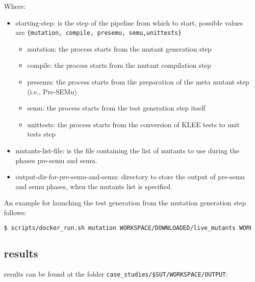Where:
\begin{itemize}
	\item starting-step: is the step of the pipeline from which to start, possible values are \texttt{\{mutation, compile, presemu, semu,unittests\}}
	\begin{itemize}
		\item mutation: the process starts from the mutant generation step
		\item compile: the process starts from the mutant compilation step
		\item presemu: the process starts from the preparation of the meta mutant step (i.e., Pre-SEMu)
		\item semu: the process starts from the test generation step itself
		\item unittests: the process starts from the conversion of KLEE tests to unit tests step
	\end{itemize}
	\item mutants-list-file: is the file containing the list of mutants to use during the phases pre-semu and semu.
	\item output-dir-for-pre-semu-and-semu: directory to store the output of pre-semu and semu phases, when the mutants list is specified.
\end{itemize}

An example for launching the test generation from the mutation generation step follows:

\begin{lstlisting}[language=bash]
 $ scripts/docker_run.sh mutation WORKSPACE/DOWNLOADED/live_mutants WORKSPACE/OUTPUT/live_mutants_output
\end{lstlisting}

\subsection{\SEMUS results}

\SEMUS results can be found at the folder \texttt{case\_studies/\$SUT/WORKSPACE/OUTPUT}:

